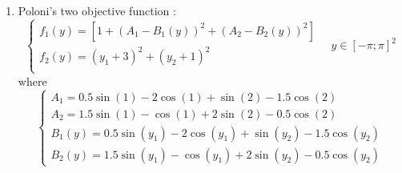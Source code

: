 \documentclass{llncs}
\begin{document}
\begin{enumerate}
  \item Poloni's two objective function \cite{Huband2006}:
    \begin{equation}
      \left \{
      \begin{array}{l}
        f_{1}\left(y\right) = \left[1 + \left(A_{1} - B_{1}\left(y\right) \right)^{2} + \left(A_{2} -
B_{2}\left(y\right) \right)^{2} \right] \\
        f_{2}\left(y\right) = \left(y_1 + 3\right)^{2} + \left(y_2 + 1 \right)^{2} \\
      \end{array}
      \right .
      \quad y\in [-\pi;\pi]^2
    \end{equation}
    where
    \begin{equation*}
      \begin{cases}
        A_{1} = 0.5 \sin \left(1\right) - 2 \cos \left(1\right) + \sin \left(2\right) - 1.5 \cos
\left(2\right)  \\
        A_{2} = 1.5 \sin \left(1\right) - \cos \left(1\right) + 2 \sin \left(2\right) - 0.5 \cos
\left(2\right)  \\
        B_{1}\left(y\right) = 0.5 \sin \left(y_1\right) - 2 \cos \left(y_1\right) + \sin \left(y_2\right) -
1.5 \cos \left(y_2\right)  \\
        B_{2}\left(y\right) = 1.5 \sin \left(y_1\right) - \cos \left(y_1\right) + 2 \sin \left(y_2\right) -
0.5 \cos \left(y_2\right)
      \end{cases}
    \end{equation*}
\end{enumerate}
\end{document}
